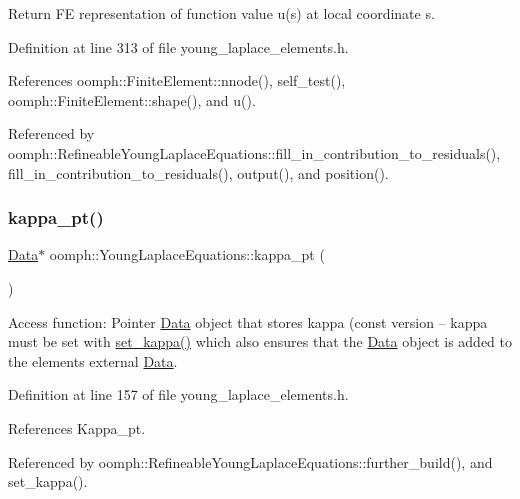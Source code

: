 Return FE representation of function value u(s) at local coordinate s. 



Definition at line 313 of file young\+\_\+laplace\+\_\+elements.\+h.



References oomph\+::\+Finite\+Element\+::nnode(), self\+\_\+test(), oomph\+::\+Finite\+Element\+::shape(), and u().



Referenced by oomph\+::\+Refineable\+Young\+Laplace\+Equations\+::fill\+\_\+in\+\_\+contribution\+\_\+to\+\_\+residuals(), fill\+\_\+in\+\_\+contribution\+\_\+to\+\_\+residuals(), output(), and position().

\mbox{\label{classoomph_1_1YoungLaplaceEquations_af77f2f14be61aa0bd4f28c5df4fc712a}} 
\subsubsection{\texorpdfstring{kappa\+\_\+pt()}{kappa\_pt()}}
{\footnotesize\ttfamily \hyperlink{classoomph_1_1Data}{Data}$\ast$ oomph\+::\+Young\+Laplace\+Equations\+::kappa\+\_\+pt (\begin{DoxyParamCaption}{ }\end{DoxyParamCaption})\hspace{0.3cm}{\ttfamily [inline]}}



Access function\+: Pointer \hyperlink{classoomph_1_1Data}{Data} object that stores kappa (const version -- kappa must be set with \hyperlink{classoomph_1_1YoungLaplaceEquations_a2f1e916b64e50292e47827ea7ba41db5}{set\+\_\+kappa()} which also ensures that the \hyperlink{classoomph_1_1Data}{Data} object is added to the element\textquotesingle{}s external \hyperlink{classoomph_1_1Data}{Data}. 



Definition at line 157 of file young\+\_\+laplace\+\_\+elements.\+h.



References Kappa\+\_\+pt.



Referenced by oomph\+::\+Refineable\+Young\+Laplace\+Equations\+::further\+\_\+build(), and set\+\_\+kappa().


